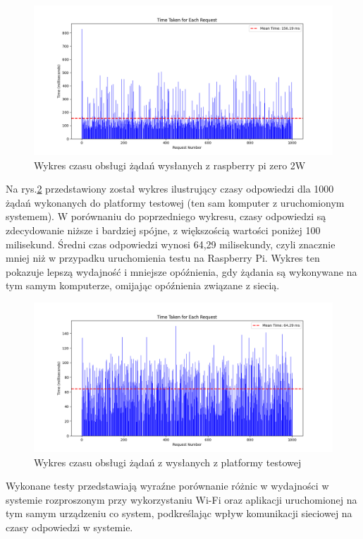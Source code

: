 \begin{figure}[!htbp]
    \centering
    \includegraphics[width=\textwidth]{images/testy/tests.png}
    \caption{Wykres czasu obsługi żądań wysłanych z raspberry pi zero 2W}
    \label{testraspberryPiGraph}
\end{figure}

\newpage Na rys.\ref{testlocalhostGraph} przedstawiony został wykres ilustrujący czasy odpowiedzi dla 1000 żądań wykonanych do platformy testowej (ten sam komputer z uruchomionym systemem). W porównaniu do poprzedniego wykresu, czasy odpowiedzi są zdecydowanie niższe i bardziej spójne, z większością wartości poniżej 100 milisekund. Średni czas odpowiedzi wynosi 64,29 milisekundy, czyli znacznie mniej niż w przypadku uruchomienia testu na Raspberry Pi. Wykres ten pokazuje lepszą wydajność i mniejsze opóźnienia, gdy żądania są wykonywane na tym samym komputerze, omijając opóźnienia związane z siecią.


\begin{figure}[!htbp]
    \centering
    \includegraphics[width=\textwidth]{images/testy/testsLocalhost.png}
    \caption{Wykres czasu obsługi żądań z wysłanych z platformy testowej}
    \label{testlocalhostGraph}
\end{figure}

\newpage Wykonane testy przedstawiają wyraźne porównanie różnic w wydajności w systemie rozproszonym przy wykorzystaniu Wi-Fi oraz aplikacji uruchomionej na tym samym urządzeniu co system, podkreślając wpływ komunikacji sieciowej na czasy odpowiedzi w systemie.
